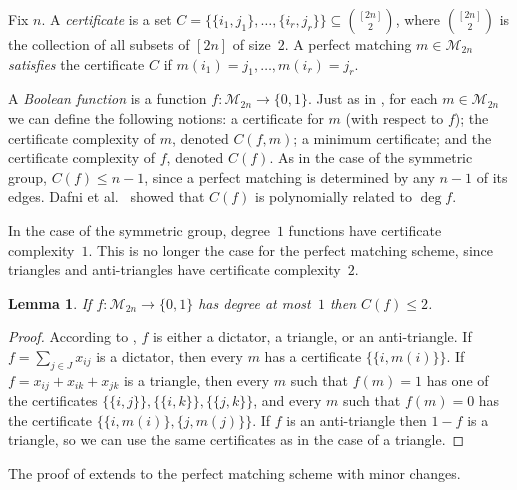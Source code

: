 \documentclass[10pt,a4paper]{amsart}
\newtheorem{lemma}[theorem]{Lemma}
\theoremstyle{definition}
\providecommand{\cM}{\mathcal{M}}
\begin{document}
Fix $n$. A \emph{certificate} is a set $C = \bigl\{ \{i_1,j_1\}, \ldots, \{i_r,j_r\} \bigr\} \subseteq \binom{[2n]}{2}$, where $\binom{[2n]}{2}$ is the collection of all subsets of $[2n]$ of size~$2$. A perfect matching $m \in \cM_{2n}$ \emph{satisfies} the certificate $C$ if $m(i_1) = j_1,\ldots,m(i_r) = j_r$.

A \emph{Boolean function} is a function $f\colon \cM_{2n} \to \{0,1\}$. Just as in , for each $m \in \cM_{2n}$ we can define the following notions: a certificate for $m$ (with respect to $f$); the certificate complexity of $m$, denoted $C(f,m)$; a minimum certificate; and the certificate complexity of $f$, denoted $C(f)$. As in the case of the symmetric group, $C(f) \leq n-1$, since a perfect matching is determined by any $n-1$ of its edges. Dafni et al.~\cite{DFLLV} showed that $C(f)$ is polynomially related to $\deg f$.

In the case of the symmetric group, degree~$1$ functions have certificate complexity~$1$. This is no longer the case for the perfect matching scheme, since triangles and anti-triangles have certificate complexity~$2$. 

\begin{lemma} \label{lem:degree1-cert-pms}
If $f\colon \cM_{2n} \to \{0,1\}$ has degree at most~$1$ then $C(f) \leq 2$.
\end{lemma}
\begin{proof}
According to , $f$ is either a dictator, a triangle, or an anti-triangle. If $f = \sum_{j \in J} x_{ij}$ is a dictator, then every $m$ has a certificate $\bigl\{ \{i,m(i)\} \bigr\}$. If $f = x_{ij} + x_{ik} + x_{jk}$ is a triangle, then every $m$ such that $f(m) = 1$ has one of the certificates $\bigl\{\{i,j\}\bigr\},\bigl\{\{i,k\}\bigr\},\bigl\{\{j,k\}\bigr\}$, and every $m$ such that $f(m) = 0$ has the certificate $\bigl\{\{i,m(i)\},\{j,m(j)\}\bigr\}$. If $f$ is an anti-triangle then $1-f$ is a triangle, so we can use the same certificates as in the case of a triangle.
\end{proof}

The proof of  extends to the perfect matching scheme with minor changes.
\end{document}
